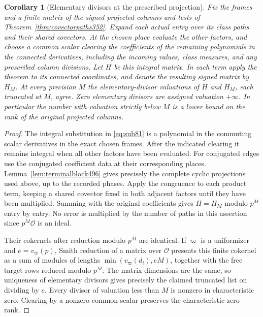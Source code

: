 \documentclass[a4paper,11pt]{article}
\newtheorem{corollary}[proposition]{Corollary}
\theoremstyle{definition}
\theoremstyle{remark}
\numberwithin{equation}{section}
\begin{document}
\begin{corollary}[Elementary divisors at the prescribed projection]
\leavevmode\label{cor:signedprecision516}
Fix the frames and a finite matrix of the signed projected columns
and tests of Theorem~\ref{thm:covectorpaths352}. Expand each actual
entry over its class paths and their shared covectors. At the
chosen place evaluate the other factors, and choose a common
scalar clearing the coefficients of the remaining polynomials
in the connected derivatives, including the incoming values,
class measures, and any prescribed column divisions. Let \(H\)
be this integral matrix. In each term apply the theorem to its
connected coordinates, and denote the resulting signed matrix
by \(H_M\). At every precision \(M\) the elementary-divisor
valuations of \(H\) and \(H_M\), each truncated at \(M\), agree.
Zero elementary divisors are assigned valuation \(+\infty\).
In particular the number with valuation strictly below \(M\)
is a lower bound on the rank of the original projected columns.
\end{corollary}
\begin{proof}
The integral substitution in \eqref{eq:sub81} is a polynomial
in the commuting scalar derivatives in the exact chosen frames.
After the indicated clearing it remains integral when all other
factors have been evaluated. For conjugated edges use the
conjugated coefficient data at their corresponding places.
Lemma~\ref{lem:terminalblock496} gives precisely the complete
cyclic projections used above, up to the recorded phases. Apply
the congruence to each product term, keeping a shared covector
fixed in both adjacent factors until they have been multiplied.
Summing with the original coefficients gives \(H=H_M\) modulo
\(p^M\) entry by entry. No error is multiplied by the number
of paths in this assertion since \(p^M\mathcal O\) is an ideal.

Their cokernels after reduction modulo \(p^M\) are identical.
If \(\varpi\) is a uniformizer and \(e=v_\varpi(p)\), Smith
reduction of a matrix over \(\mathcal O\) presents this finite
cokernel as a sum of modules of lengths \(\min(v_\varpi(d_i),eM)\),
together with the free target rows reduced modulo \(p^M\).
The matrix dimensions are the same, so uniqueness of elementary
divisors gives precisely the claimed truncated list on dividing
by \(e\). Every divisor of valuation less than \(M\) is nonzero
in characteristic zero. Clearing by a nonzero common scalar
preserves the characteristic-zero rank.
\end{proof}
\end{document}
